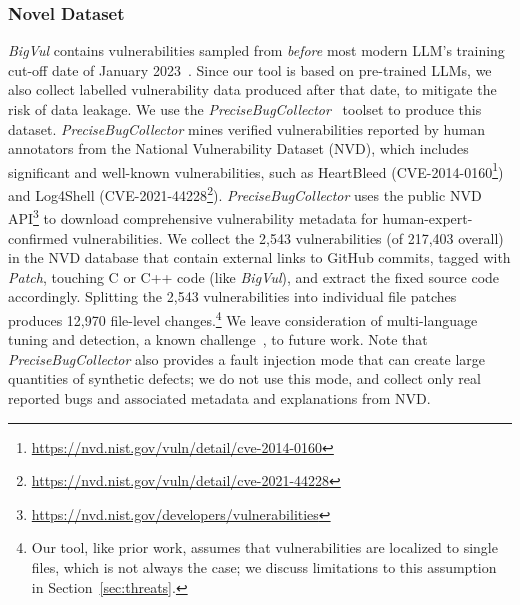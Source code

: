 \documentclass[12pt,openany,oneside,table]{cmuthesis}
\begin{document}
\subsubsection{Novel Dataset}
\textit{BigVul} contains vulnerabilities sampled from \textit{before} most modern LLM's training cut-off date of January 2023~\cite{bigvul, zhou2019devign, linevul}. Since our tool is based on pre-trained LLMs, we also collect labelled vulnerability data produced after that date, to mitigate the risk of data leakage. 
We use the \textit{PreciseBugCollector}~\cite{precisebugs} toolset to produce this dataset.
%
\textit{PreciseBugCollector} mines verified vulnerabilities reported by human annotators from the National Vulnerability Dataset (NVD), which includes significant and well-known vulnerabilities, such as HeartBleed (CVE-2014-0160\footnote{\url{https://nvd.nist.gov/vuln/detail/cve-2014-0160}}) %
and Log4Shell (CVE-2021-44228\footnote{\url{https://nvd.nist.gov/vuln/detail/cve-2021-44228}}).
\textit{PreciseBugCollector} uses the public NVD API\footnote{\url{https://nvd.nist.gov/developers/vulnerabilities}} to download comprehensive vulnerability metadata for human-expert-confirmed vulnerabilities. 
%
We collect the 2,543 vulnerabilities (of 217,403 overall) in the NVD database that contain external links to GitHub commits, tagged with \textit{Patch}, touching C or C++ code (like \textit{BigVul}), and extract the fixed source code accordingly.  Splitting the 2,543 vulnerabilities into individual file patches produces 12,970 file-level changes.\footnote{Our tool, like prior work, assumes that vulnerabilities are localized to single files, which is not always the case; we discuss limitations to this assumption in Section~\ref{sec:threats}.} We leave consideration of multi-language tuning and detection, a known challenge~\cite{instruct_vul}, to future work.  Note that \emph{PreciseBugCollector} also provides a fault injection mode that can create large quantities of synthetic defects; we do not use this mode, and collect only real reported bugs and associated metadata and explanations from NVD. 
\end{document}
